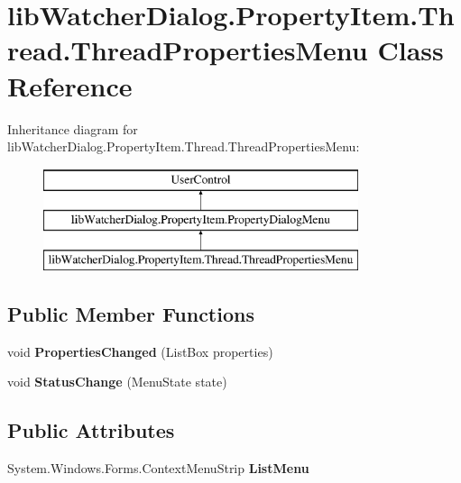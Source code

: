 \hypertarget{classlib_watcher_dialog_1_1_property_item_1_1_thread_1_1_thread_properties_menu}{\section{lib\+Watcher\+Dialog.\+Property\+Item.\+Thread.\+Thread\+Properties\+Menu Class Reference}
\label{classlib_watcher_dialog_1_1_property_item_1_1_thread_1_1_thread_properties_menu}
}
Inheritance diagram for lib\+Watcher\+Dialog.\+Property\+Item.\+Thread.\+Thread\+Properties\+Menu\+:\begin{figure}[H]
\begin{center}
\leavevmode
\includegraphics[height=3.000000cm]{classlib_watcher_dialog_1_1_property_item_1_1_thread_1_1_thread_properties_menu}
\end{center}
\end{figure}
\subsection*{Public Member Functions}
\begin{DoxyCompactItemize}
\item 
\hypertarget{classlib_watcher_dialog_1_1_property_item_1_1_thread_1_1_thread_properties_menu_ae1ba90855a272ae072c3ad49f7cbfe36}{void {\bfseries Properties\+Changed} (List\+Box properties)}\label{classlib_watcher_dialog_1_1_property_item_1_1_thread_1_1_thread_properties_menu_ae1ba90855a272ae072c3ad49f7cbfe36}

\item 
\hypertarget{classlib_watcher_dialog_1_1_property_item_1_1_thread_1_1_thread_properties_menu_a11c8c12d5a51ba9450962ce58e6c2670}{void {\bfseries Status\+Change} (Menu\+State state)}\label{classlib_watcher_dialog_1_1_property_item_1_1_thread_1_1_thread_properties_menu_a11c8c12d5a51ba9450962ce58e6c2670}

\end{DoxyCompactItemize}
\subsection*{Public Attributes}
\begin{DoxyCompactItemize}
\item 
\hypertarget{classlib_watcher_dialog_1_1_property_item_1_1_thread_1_1_thread_properties_menu_a867a9333b1d5d479a51f769b2e4ed44d}{System.\+Windows.\+Forms.\+Context\+Menu\+Strip {\bfseries List\+Menu}}\label{classlib_watcher_dialog_1_1_property_item_1_1_thread_1_1_thread_properties_menu_a867a9333b1d5d479a51f769b2e4ed44d}

\end{DoxyCompactItemize}
